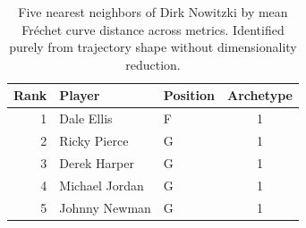 \begin{table}[htbp]
  \centering\small
  \begin{tabular}{rllc}
    \toprule
    Rank & Player & Position & Archetype \\
    \midrule
    1 & Dale Ellis & F & 1 \\
    2 & Ricky Pierce & G & 1 \\
    3 & Derek Harper & G & 1 \\
    4 & Michael Jordan & G & 1 \\
    5 & Johnny Newman & G & 1 \\
    \bottomrule
  \end{tabular}
  \caption{Five nearest neighbors of Dirk Nowitzki by mean Fr\'{e}chet curve distance across metrics. Identified purely from trajectory shape without dimensionality reduction.}
  \label{tab:Dirk_Nowitzki_frechet_curve_neighbors}
\end{table}

